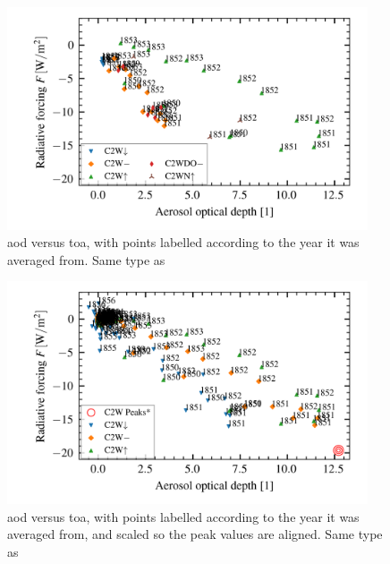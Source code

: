 \documentclass{ametsocV5}
\begin{document}
\begin{figure}
  \begin{center}
    \includegraphics[width=0.95\textwidth]{figures/aod_vs_toa_avg_loop.png}
  \end{center}
  \caption{
    \acrshort{aod} versus \acrshort{toa}, with points labelled according to the
    year it was averaged from. Same type as \citet{gregory2016}
  }
  \label{fig:aod_vs_toa_avg_loop}
\end{figure}

\begin{figure}
  \begin{center}
    \includegraphics[width=0.95\textwidth]{figures/aod_vs_toa_avg_loop_scaled.png}
  \end{center}
  \caption{
    \acrshort{aod} versus \acrshort{toa}, with points labelled according to the
    year it was averaged from, and scaled so the peak values are aligned. Same type as
    \citet{gregory2016}
  }
  \label{fig:aod_vs_toa_avg_loop_scaled}
\end{figure}
\end{document}
